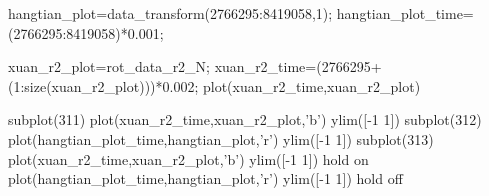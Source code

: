 hangtian_plot=data_transform(2766295:8419058,1);
hangtian_plot_time=(2766295:8419058)*0.001;

xuan_r2_plot=rot_data_r2_N;
xuan_r2_time=(2766295+(1:size(xuan_r2_plot)))*0.002;
plot(xuan_r2_time,xuan_r2_plot)



subplot(311)
plot(xuan_r2_time,xuan_r2_plot,'b')
ylim([-1 1])
subplot(312)
plot(hangtian_plot_time,hangtian_plot,'r')
ylim([-1 1])
subplot(313)
plot(xuan_r2_time,xuan_r2_plot,'b')
ylim([-1 1])
hold on
plot(hangtian_plot_time,hangtian_plot,'r')
ylim([-1 1])
hold off